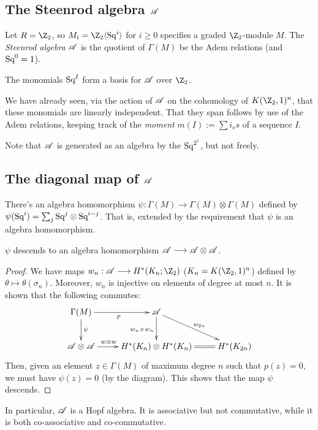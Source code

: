 \documentclass[11pt]{article}
\begin{document}
{\subsection{The Steenrod algebra \texorpdfstring{$\mathscr{A}$}{A}}
Let $R=\Z_2$, so $M_i=\Z_2\langle\Squ^i\rangle$ for $i\geq0$ specifies a graded $\Z_2$-module $M$. The \emph{Steenrod algebra} $\mathscr{A}$ is the quotient of $\Gamma(M)$ be the Adem relations (and $\textup{Sq}^0=1$).
\begin{thm*}
The monomials $\textup{Sq}^I$ form a basis for $\mathscr{A}$ over $\Z_2$.
\end{thm*}
We have already seen, via the action of $\mathscr{A}$ on the cohomology of $K(\Z_2,1)^n$, that these monomials are linearly independent. That they span follows by use of the Adem relations, keeping track of the \emph{moment} $m(I):=\sum i_ss$ of a sequence $I$.

Note that $\mathscr{A}$ is generated as an algebra by the $\textup{Sq}^{2^i}$, but not freely.
\setcounter{subsection}{3}
\subsection{The diagonal map of \texorpdfstring{$\mathscr{A}$}{A}}
There's an algebra homomorphism $\psi:\Gamma(M)\to\Gamma(M)\otimes\Gamma(M)$ defined by $\psi(\textup{Sq}^i)=\sum_j \textup{Sq}^j\otimes\textup{Sq}^{i-j}$. That is, extended by the requirement that $\psi$ is an algebra homomorphism.
\begin{thm*}
$\psi$ descends to an algebra homomorphism $\mathscr{A}\longrightarrow\mathscr{A}\otimes\mathscr{A}$.
\end{thm*}
\begin{proof}
We have maps $w_n:\Steen\to H^*(K_n;\Z_2)$ ($K_n=K(\Z_2,1)^n$) defined by $\theta\mapsto\theta(\sigma_n)$. Moreover, $w_n$ is injective on elements of degree at most $n$. It is shown  that the following commutes:
\[\xymatrix{
\Gamma(M)\ar[r]_p\ar[d]^\psi&\Steen\ar[d]_{w_n\times w_n}\ar[rd]^{w_{2n}}\\
\Steen\otimes\Steen\ar[r]^{w\otimes w\qquad \ }&H^*(K_n)\otimes H^*(K_n)\ar@{=}[r]&H^*(K_{2n})
}\]
Then, given an element $z\in\Gamma(M)$ of maximum degree $n$ such that $p(z)=0$, we must have $\psi(z)=0$ (by the diagram). This shows that the map $\psi$ descends.%
\end{proof}
In particular, $\mathscr{A}$ is a Hopf algebra. It is associative but not commutative, while it is both co-associative and co-commutative.
}
\end{document}
